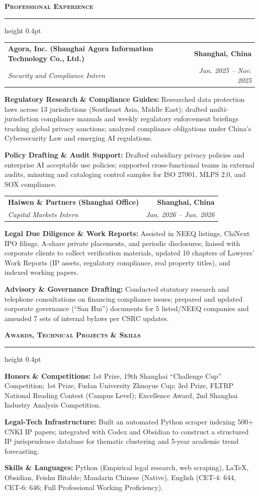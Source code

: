 \documentclass[9.5pt,a4paper]{article}
\makeatletter
\newcommand{\resumesection}[1]{%
  \vspace{3pt}%
  {\normalsize\textbf{\textsc{#1}}}%
  \vspace{1pt}%
  \hrule height 0.4pt%
  \vspace{2pt}%
}
\newenvironment{resumelist}{%
  \begin{list}{\raisebox{0.2ex}{\tiny$\bullet$}}{%
    \setlength{\leftmargin}{11pt}%
    \setlength{\rightmargin}{0pt}%
    \setlength{\labelwidth}{7pt}%
    \setlength{\labelsep}{4pt}%
    \setlength{\itemsep}{0.8pt}%
    \setlength{\parsep}{0pt}%
    \setlength{\topsep}{0.8pt}%
    \setlength{\partopsep}{0pt}%
  }%
}{%
  \end{list}%
  \vspace{0pt}%
}
\newcommand{\resumeSubheading}[4]{%
  \noindent\begin{tabularx}{\textwidth}{@{}X r@{}}%
    \textbf{#1} & \textbf{\footnotesize #2} \\%
    \textit{\footnotesize #3} & \textit{\footnotesize #4} \\%
  \end{tabularx}%
  \vspace{-3pt}%
}
\makeatother
\begin{document}
\resumesection{Professional Experience}

\resumeSubheading{Agora, Inc. (Shanghai Agora Information Technology Co., Ltd.)}{Shanghai, China}{Security and Compliance Intern}{Jun. 2025 -- Nov. 2025}
\begin{resumelist}
  \item \textbf{Regulatory Research \& Compliance Guides:} Researched data protection laws across 13 jurisdictions (Southeast Asia, Middle East); drafted multi-jurisdiction compliance manuals and weekly regulatory enforcement briefings tracking global privacy sanctions; analyzed compliance obligations under China's Cybersecurity Law and emerging AI regulations.
  \item \textbf{Policy Drafting \& Audit Support:} Drafted subsidiary privacy policies and enterprise AI acceptable use policies; supported cross-functional teams in external audits, minuting and cataloging control samples for ISO 27001, MLPS 2.0, and SOX compliance.
\end{resumelist}

\resumeSubheading{Haiwen \& Partners (Shanghai Office)}{Shanghai, China}{Capital Markets Intern}{Jan. 2026 -- Jun. 2026}
\begin{resumelist}
  \item \textbf{Legal Due Diligence \& Work Reports:} Assisted in NEEQ listings, ChiNext IPO filings, A-share private placements, and periodic disclosures; liaised with corporate clients to collect verification materials, updated 10 chapters of Lawyers' Work Reports (IP assets, regulatory compliance, real property titles), and indexed working papers.
  \item \textbf{Advisory \& Governance Drafting:} Conducted statutory research and telephone consultations on financing compliance issues; prepared and updated corporate governance (``San Hui'') documents for 5 listed/NEEQ companies and amended 7 sets of internal bylaws per CSRC updates.
\end{resumelist}

\resumesection{Awards, Technical Projects \& Skills}
\begin{resumelist}
  \item \textbf{Honors \& Competitions:} 1st Prize, 19th Shanghai ``Challenge Cup'' Competition; 1st Prize, Fudan University Zhuoyue Cup; 3rd Prize, FLTRP National Reading Contest (Campus Level); Excellence Award, 2nd Shanghai Industry Analysis Competition.
  \item \textbf{Legal-Tech Infrastructure:} Built an automated Python scraper indexing 500+ CNKI IP papers; integrated with Codex and Obsidian to construct a structured IP jurisprudence database for thematic clustering and 5-year academic trend forecasting.
  \item \textbf{Skills \& Languages:} Python (Empirical legal research, web scraping), LaTeX, Obsidian, Feishu Bitable; Mandarin Chinese (Native), English (CET-4: 644, CET-6: 646; Full Professional Working Proficiency).
\end{resumelist}
\end{document}
